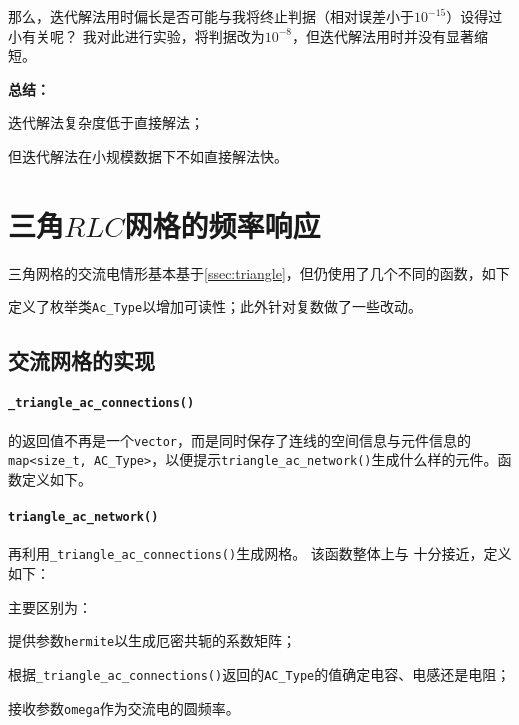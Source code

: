 那么，迭代解法用时偏长是否可能与我将终止判据（相对误差小于$10^{-15}$）设得过小有关呢？
我对此进行实验，将判据改为$10^{-8}$，但迭代解法用时并没有显著缩短。

\textbf{总结：}\begin{inparaenum}
    \item 迭代解法复杂度低于直接解法；
    \item 但迭代解法在小规模数据下不如直接解法快。
\end{inparaenum}

\section{三角\texorpdfstring{$RLC$}{RLC}网格的频率响应}
三角网格的交流电情形基本基于\autoref{ssec:triangle}，但仍使用了几个不同的函数，如下
{
    \linespread{1.0}
    
}
定义了枚举类\verb|Ac_Type|以增加可读性；此外针对复数做了一些改动。

\subsection{交流网格的实现}
\paragraph{\texttt{\_triangle\_ac\_connections()}}
的返回值不再是一个\verb|vector|，而是同时保存了连线的空间信息与元件信息的\texttt{map<size\_t, AC\_Type>}，以便提示\texttt{triangle\_ac\_network()}生成什么样的元件。函数定义如下。
{
    \linespread{1.0}
    
}

\paragraph{\texttt{triangle\_ac\_network()}}
再利用\texttt{\_triangle\_ac\_connections()}生成网格。
该函数整体上与  十分接近，定义如下：
{
    \linespread{1.0}
    
}
主要区别为：
\begin{compactenum}
    \item 提供参数\verb|hermite|以生成厄密共轭的系数矩阵；
    \item 根据\texttt{\_triangle\_ac\_connections()}返回的\texttt{AC\_Type}的值确定电容、电感还是电阻；
    \item 接收参数\texttt{omega}作为交流电的圆频率。
\end{compactenum}

